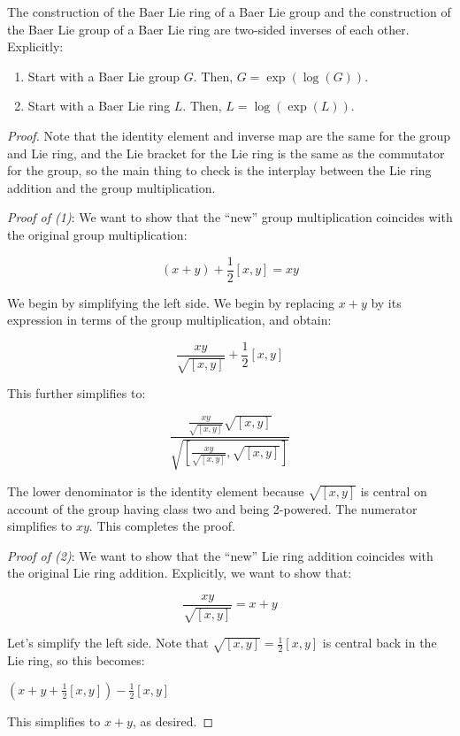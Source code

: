 \documentclass{ucetd}
\begin{document}
\begin{lemma}\label{lemma:baer-mutual-inverses}
  The construction of the Baer Lie ring of a Baer Lie group and the
  construction of the Baer Lie group of a Baer Lie ring are two-sided
  inverses of each other. Explicitly:

  \begin{enumerate}
  \item Start with a Baer Lie group $G$. Then, $G = \exp(\log(G))$.
  \item Start with a Baer Lie ring $L$. Then, $L = \log(\exp(L))$.
  \end{enumerate}
\end{lemma}

\begin{proof}
  Note that the identity element and inverse map are the same for the
  group and Lie ring, and the Lie bracket for the Lie ring is the same
  as the commutator for the group, so the main thing to check is the
  interplay between the Lie ring addition and the group
  multiplication.

  {\em Proof of (1)}: We want to show that the ``new'' group
  multiplication coincides with the original group multiplication:

  $$(x + y) + \frac{1}{2}[x,y] = xy$$

  We begin by simplifying the left side. We begin by replacing $x + y$
  by its expression in terms of the group multiplication, and obtain:

  $$\frac{xy}{\sqrt{[x,y]}} + \frac{1}{2}[x,y]$$

  This further simplifies to:

  $$\frac{\frac{xy}{\sqrt{[x,y]}} \sqrt{[x,y]}}{\sqrt{\left[\frac{xy}{\sqrt{[x,y]}},\sqrt{[x,y]}\right]}}$$

  
  The lower denominator is the identity element because $\sqrt{[x,y]}$
  is central on account of the group having class two and being
  2-powered. The numerator simplifies to $xy$. This completes
  the proof.

  {\em Proof of (2)}: We want to show that the ``new'' Lie ring
  addition coincides with the original Lie ring addition. Explicitly,
  we want to show that:
  
  $$\frac{xy}{\sqrt{[x,y]}} = x + y$$

  Let's simplify the left side. Note that $\sqrt{[x,y]} =
  \frac{1}{2}[x,y]$ is central back in the Lie ring, so this becomes:
  
  $(x + y + \frac{1}{2}[x,y]) - \frac{1}{2}[x,y]$

  This simplifies to $x + y$, as desired.
\end{proof}
\end{document}
